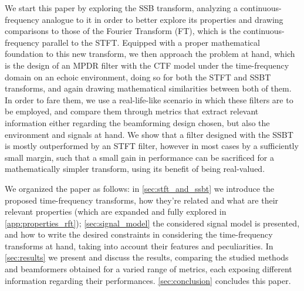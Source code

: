 We start this paper by exploring the SSB transform, analyzing a continuous-frequency analogue to it in order to better explore its properties and drawing comparisons to those of the Fourier Transform (FT), which is the continuous-frequency parallel to the STFT. Equipped with a proper mathematical foundation to this new transform, we then approach the problem at hand, which is the design of an MPDR filter with the CTF model under the time-frequency domain on an echoic environment, doing so for both the STFT and SSBT transforms, and again drawing mathematical similarities between both of them. In order to fare them, we use a real-life-like scenario in which these filters are to be employed, and compare them through metrics that extract relevant information either regarding the beamforming design chosen, but also the environment and signals at hand. We show that a filter designed with the SSBT is mostly outperformed by an STFT filter, however in most cases by a sufficiently small margin, such that a small gain in performance can be sacrificed for a mathematically simpler transform, using its benefit of being real-valued.


We organized the paper as follows:
in \cref{sec:stft_and_ssbt} we introduce the proposed time-frequency transforms, how they're related and what are their relevant properties (which are expanded and fully explored in \cref{app:properties_rft});
\cref{sec:signal_model} the considered signal model is presented, and how to write the desired constraints in considering the time-frequency transforms at hand, taking into account their features and peculiarities.
In \cref{sec:results} we present and discuss the results, comparing the studied methods and beamformers obtained for a varied range of metrics, each exposing different information regarding their performances.
\cref{sec:conclusion} concludes this paper.
